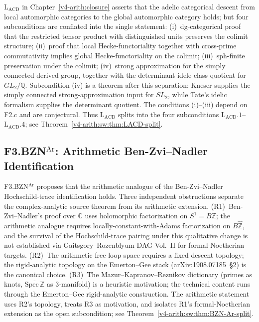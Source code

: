 \(\mathrm{L}_{\mathrm{ACD}}\) in Chapter~\ref{v4-arith:closure} asserts that
the adelic categorical descent from local automorphic categories to the
global automorphic category holds; but four subconditions are conflated
into the single statement:
(i)~dg-categorical proof that the restricted tensor product with
distinguished units preserves the colimit structure;
(ii)~proof that local Hecke-functoriality together with cross-prime
commutativity implies global Hecke-functoriality on the colimit;
(iii)~sph-finite preservation under the colimit;
(iv)~strong approximation for the simply connected derived group,
together with the determinant idele-class quotient for
\(GL_{2}/\mathbb{Q}\).
Subcondition (iv) is a theorem after this separation: Kneser supplies
the simply connected strong-approximation input for \(SL_{2}\), while
Tate's idelic formalism supplies the determinant quotient. The
conditions (i)--(iii) depend on F2.c and are conjectural.
Thus \(\mathrm{L}_{\mathrm{ACD}}\) splits into the four subconditions
\(\mathrm{L}_{\mathrm{ACD}}.1\)--\(\mathrm{L}_{\mathrm{ACD}}.4\);
see Theorem~\ref{v4-arith:sw:thm:LACD-split}.

\subsection{\texorpdfstring{F3.BZN\(^{\mathrm{Ar}}\)}{F3-BZN-Ar}: Arithmetic Ben-Zvi--Nadler Identification}

F3.BZN\(^{\mathrm{Ar}}\) proposes that the arithmetic analogue of the
Ben-Zvi--Nadler Hochschild-trace identification holds. Three
independent obstructions separate the complex-analytic source theorem
from its arithmetic extension.
(R1)~Ben-Zvi--Nadler's proof over \(\mathbb{C}\) uses holomorphic
factorization on \(S^{1}=B\mathbb{Z}\); the arithmetic analogue requires
locally-constant-with-Adams factorization on \(B\widehat{\mathbb{Z}}\),
and the survival of the Hochschild-trace pairing under this qualitative
change is not established via Gaitsgory--Rozenblyum DAG Vol.~II for
formal-Noetherian targets.
(R2)~The arithmetic free loop space requires a fixed descent topology;
the rigid-analytic topology on the Emerton--Gee stack (arXiv:1908.07185~\S2)
is the canonical choice.
(R3)~The Mazur--Kapranov--Reznikov dictionary (primes as knots,
\(\overline{\mathrm{Spec}\,\mathbb{Z}}\) as 3-manifold) is a heuristic
motivation; the technical content runs through the
Emerton--Gee rigid-analytic construction.
The arithmetic statement uses R2's topology, treats R3 as motivation,
and isolates R1's formal-Noetherian extension as the open
subcondition; see Theorem~\ref{v4-arith:sw:thm:BZN-Ar-split}.

